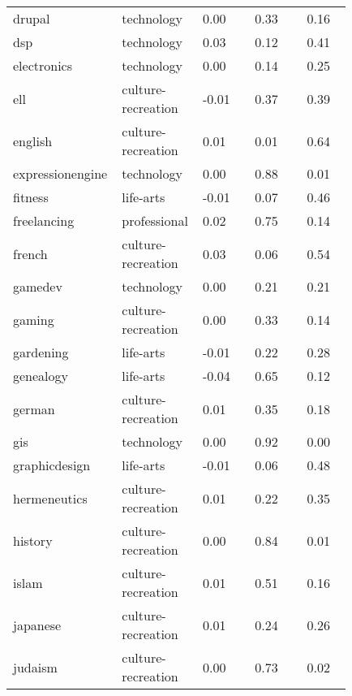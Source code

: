 \begin{longtabu}{@{}
	p{0.2\linewidth}
	p{0.2\linewidth}
	P{0.15\linewidth}
	P{0.15\linewidth}
	P{0.13\linewidth}@{}}
drupal           & technology         & 0.00        & 0.33          & 0.16           \\
dsp              & technology         & 0.03        & 0.12          & 0.41           \\
electronics      & technology         & 0.00        & 0.14          & 0.25           \\
ell              & culture-recreation & -0.01       & 0.37          & 0.39           \\
english          & culture-recreation & 0.01        & 0.01          & 0.64           \\
expressionengine & technology         & 0.00        & 0.88          & 0.01           \\
fitness          & life-arts          & -0.01       & 0.07          & 0.46           \\
freelancing      & professional       & 0.02        & 0.75          & 0.14           \\
french           & culture-recreation & 0.03        & 0.06          & 0.54           \\
gamedev          & technology         & 0.00        & 0.21          & 0.21           \\
gaming           & culture-recreation & 0.00        & 0.33          & 0.14           \\
gardening        & life-arts          & -0.01       & 0.22          & 0.28           \\
genealogy        & life-arts          & -0.04       & 0.65          & 0.12           \\
german           & culture-recreation & 0.01        & 0.35          & 0.18           \\
gis              & technology         & 0.00        & 0.92          & 0.00           \\
graphicdesign    & life-arts          & -0.01       & 0.06          & 0.48           \\
hermeneutics     & culture-recreation & 0.01        & 0.22          & 0.35           \\
history          & culture-recreation & 0.00        & 0.84          & 0.01           \\
islam            & culture-recreation & 0.01        & 0.51          & 0.16           \\
japanese         & culture-recreation & 0.01        & 0.24          & 0.26           \\
judaism          & culture-recreation & 0.00        & 0.73          & 0.02           \\

\end{longtabu}
